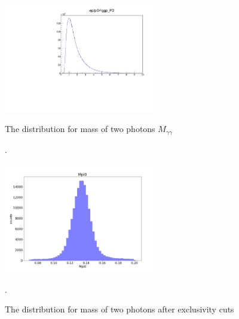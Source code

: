 \begin{figure}[hbt]
	\centering
	\includegraphics[page=6,width=0.6\textwidth]{Chapters/Ch4-BaseAnalysis/pid_figs/eppi0.exclusive.pdf}
	
	\caption{The distribution for mass of two photons $M_{\gamma\gamma}$}.
	\label{fig:ggmass}
	
	\centering
	\includegraphics[width=0.6\textwidth]{Chapters/Ch4-BaseAnalysis/pid_figs/Mpi0.png}
	
	\caption{The distribution for mass of two photons after exclusivity cuts}.
	\label{fig:ggmass_after}
	
\end{figure}
